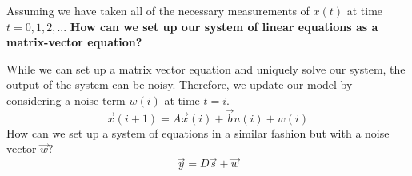 \begin{enumerate}
  \qitem Assuming we have taken all of the necessary measurements of $x(t)$ at time $t = 0, 1, 2, ...$ \vskip 1pt
  \textbf{How can we set up our system of linear equations as a matrix-vector equation?}


  \qitem While we can set up a matrix vector equation and uniquely solve our system, the output of the system can be noisy.
  Therefore, we update our model by considering a noise term $w(i)$ at time $t = i.$
  \begin{equation}
    \vec{x}(i + 1) = A \vec{x}(i) + \vec{b} u(i) + w(i)
  \end{equation}
  How can we set up a system of equations in a similar fashion but with a noise vector $\vec{w}?$
  \begin{equation}
    \vec{y} = D \vec{s} + \vec{w}
  \end{equation}


\end{enumerate}
